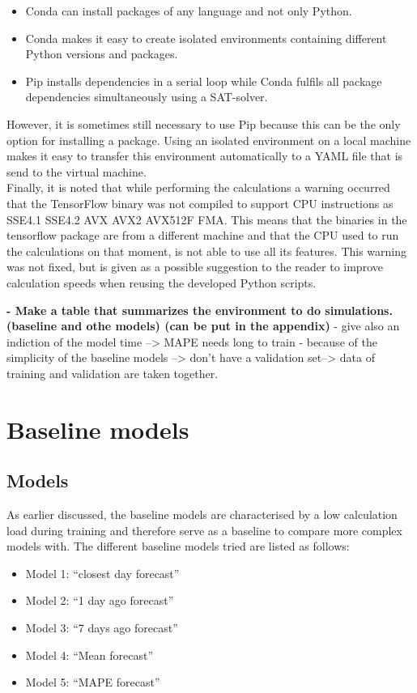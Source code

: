 \begin{itemize}
	\item Conda can install packages of any language and not only Python.
	\item Conda makes it easy to create isolated environments containing different Python versions and packages.
	\item Pip installs dependencies in a serial loop while Conda fulfils all package dependencies simultaneously using a SAT-solver.  
\end{itemize}

However, it is sometimes still necessary to use Pip because this can be the only option for installing a package. Using an isolated environment on a local machine makes it easy to transfer this environment automatically to a YAML file that is send to the virtual machine.\\

Finally, it is noted that while performing the calculations a warning occurred that the TensorFlow binary was not compiled to support CPU instructions as SSE4.1 SSE4.2 AVX AVX2 AVX512F FMA. This means that the binaries in the tensorflow package are from a different machine and that the CPU used to run the calculations on that moment, is not able to use all its features. This warning was not fixed, but is given as a possible suggestion to the reader to improve calculation speeds when reusing the developed Python scripts.


\textbf{- Make a table that summarizes the environment to do simulations.(baseline and othe models) (can be put in the appendix)}
- give also an indiction of the model time --> MAPE needs long to train
- because of the simplicity of the baseline models --> don't have a validation set--> data of training and validation are taken together. 
\section{Baseline models}\label{s:Baseline models}
\subsection{Models}
As earlier discussed, the baseline models are characterised by a low calculation load during training and therefore serve as a baseline to compare more complex models with. The different baseline models tried are listed as follows:
\begin{itemize}
	\item Model 1: ``closest day forecast''
	\item Model 2: ``1 day ago forecast''
	\item Model 3: ``7 days ago forecast''
	\item Model 4: ``Mean forecast''
	\item Model 5: ``MAPE forecast''
\end{itemize} 

